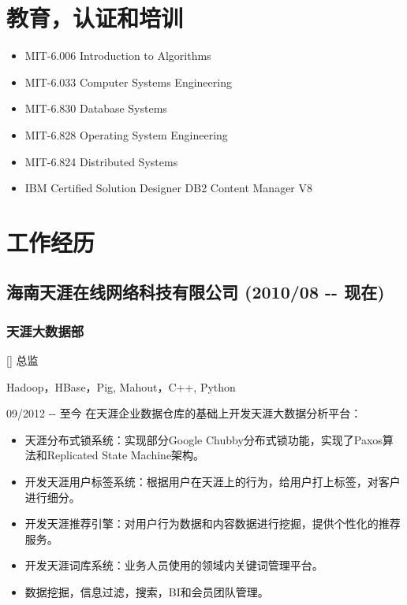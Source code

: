 \documentclass[a4paper]{article}
\newenvironment{DUlineblock}[1]{%
    \list{}{\setlength{\partopsep}{\parskip}
            \addtolength{\partopsep}{\baselineskip}
            \setlength{\topsep}{0pt}
            \setlength{\itemsep}{0.15\baselineskip}
            \setlength{\parsep}{0pt}
            \setlength{\leftmargin}{#1}}
    \raggedright
  }
  {\endlist}
\begin{document}
\begin{CJK}{UTF8}{gkai}
\section*{教育，认证和培训}
\begin{itemize}
\item MIT-6.006 Introduction to Algorithms
\item MIT-6.033 Computer Systems Engineering
\item MIT-6.830 Database Systems
\item MIT-6.828 Operating System Engineering
\item MIT-6.824 Distributed Systems
\item IBM Certified Solution Designer DB2 Content Manager V8
\end{itemize}

\section*{工作经历}
\subsection*{海南天涯在线网络科技有限公司 (2010/08 -{}- 现在)}

\subsubsection*{天涯大数据部}
\begin{DUlineblock}{0em}
\item[] 总监
\item[] Hadoop，HBase，Pig, Mahout，C++, Python
\item[] 09/2012 -{}- 至今
\end{DUlineblock}
在天涯企业数据仓库的基础上开发天涯大数据分析平台：
\begin{itemize}
\item 天涯分布式锁系统：实现部分Google Chubby分布式锁功能，实现了Paxos算法和Replicated State Machine架构。
\item 开发天涯用户标签系统：根据用户在天涯上的行为，给用户打上标签，对客户进行细分。
\item 开发天涯推荐引擎：对用户行为数据和内容数据进行挖掘，提供个性化的推荐服务。
\item 开发天涯词库系统：业务人员使用的领域内关键词管理平台。
\item 数据挖掘，信息过滤，搜索，BI和会员团队管理。
\end{itemize}



\end{CJK}
\end{document}
